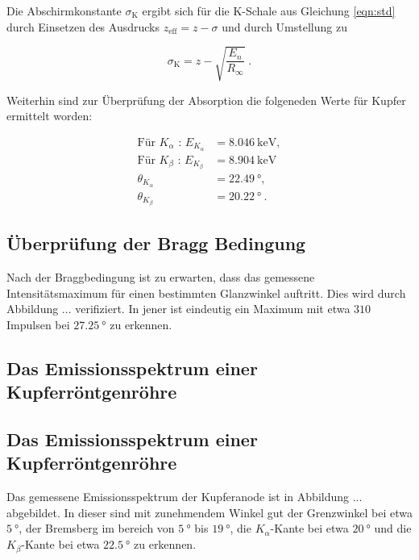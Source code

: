   Die Abschirmkonstante $\sigma_\text{K}$ ergibt sich für die K-Schale aus Gleichung
  \eqref{eqn:std} durch Einsetzen des Ausdrucks $z_\text{eff} = z -\sigma$ und durch 
  Umstellung zu 

  \begin{equation}
    \sigma_\text{K} = z - \sqrt{\frac{E_n}{R_{\infty}}} \; .
  \end{equation}

  Weiterhin sind zur Überprüfung der Absorption die folgeneden Werte für Kupfer 
  ermittelt worden:

  \begin{align*}
    \text{Für } K_\alpha \text{ : } E_{K_\alpha} &= \SI{8.046}{\kilo\eV}, \\
    \text{Für } K_\beta \text{ : } E_{K_\beta} &= \SI{8.904}{\kilo\eV} \\
    \theta_{K_\alpha} &= \SI{22.49}{\degree}, \\
    \theta_{K_\beta} &= \SI{20.22}{\degree} \: .
 \end{align*}









\subsection{Überprüfung der Bragg Bedingung}

Nach der Braggbedingung ist zu erwarten, dass das gemessene Intensitätsmaximum
für einen bestimmten Glanzwinkel auftritt. 
Dies wird durch Abbildung ... verifiziert. In jener ist eindeutig ein Maximum 
mit etwa $310$ Impulsen bei $\SI{27.25}{\degree}$ zu erkennen.

\subsection{Das Emissionsspektrum einer Kupferröntgenröhre}

\subsection{Das Emissionsspektrum einer Kupferröntgenröhre}

Das gemessene Emissionsspektrum der Kupferanode ist in Abbildung ... abgebildet.
In dieser sind mit zunehmendem Winkel gut der Grenzwinkel bei etwa $\SI{5}{\degree}$,
der Bremsberg im bereich von $\SI{5}{\degree}$ bis $\SI{19}{\degree}$, die 
$K_\alpha$-Kante bei etwa $\SI{20}{\degree}$ und die $K_\beta$-Kante bei 
etwa $\SI{22.5}{\degree}$ zu erkennen.









